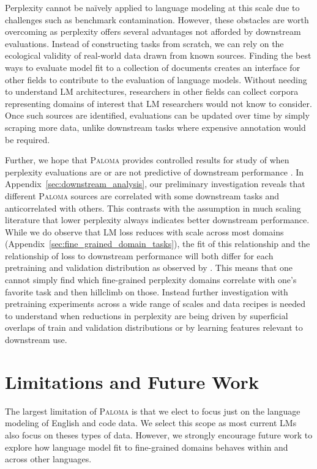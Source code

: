 Perplexity cannot be na\"{i}vely applied to language modeling at this scale due to challenges such as benchmark contamination. However, these obstacles are worth overcoming as perplexity offers several advantages not afforded by downstream evaluations. Instead of constructing tasks from scratch, we can rely on the ecological validity of real-world data drawn from known sources. Finding the best ways to evaluate model fit to a collection of documents creates an interface for other fields to contribute to the evaluation of language models. Without needing to understand LM architectures, researchers in other fields can collect corpora representing domains of interest that LM researchers would not know to consider. Once such sources are identified, evaluations can be updated over time by simply scraping more data, unlike downstream tasks where expensive annotation would be required. 

Further, we hope that \textsc{Paloma} provides controlled results for study of when perplexity evaluations are or are not predictive of downstream performance \citep{Liu2022SamePL, Tay2021ScaleEI, Ganguli2022PredictabilityAS,Xia2022TrainingTO, Gadre2024LanguageMS, Du2024UnderstandingEA}. In Appendix~\ref{sec:downstream_analysis}, our preliminary investigation reveals that different \textsc{Paloma} sources are correlated with some downstream tasks and anticorrelated with others. This contrasts with the assumption in much scaling literature that lower perplexity always indicates better downstream performance. While we do observe that LM loss reduces with scale across most domains (Appendix~\ref{sec:fine_grained_domain_tasks}), the fit of this relationship and the relationship of loss to downstream performance will both differ for each pretraining and validation distribution as observed by \citet{Gadre2024LanguageMS}. This means that one cannot simply find which fine-grained perplexity domains correlate with one's favorite task and then hillclimb on those. Instead further investigation with pretraining experiments across a wide range of scales and data recipes is needed to understand when reductions in perplexity are being driven by superficial overlaps of train and validation distributions or by learning features relevant to downstream use.

\section{Limitations and Future Work}
\label{sec:limitations}

The largest limitation of \textsc{Paloma} is that we elect to focus just on the language modeling of English and code data. We select this scope as most current LMs also focus on theses types of data. However, we strongly encourage future work to explore how language model fit to fine-grained domains behaves within and across other languages. 


